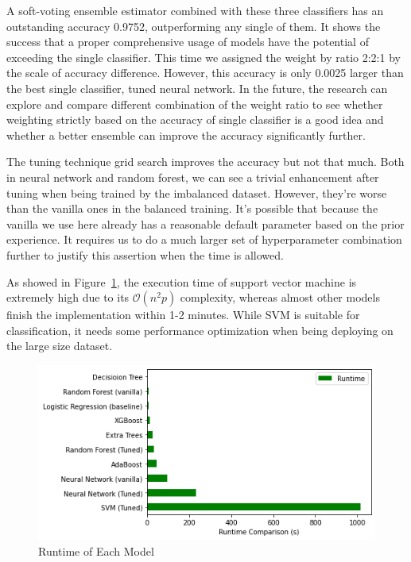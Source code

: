 \documentclass[10pt,twocolumn,letterpaper]{article}
\begin{document}
A soft-voting ensemble estimator combined with these three classifiers has an outstanding accuracy 0.9752, outperforming any single of them. It shows the success that a proper comprehensive usage of models have the potential of exceeding the single classifier. This time we assigned the weight by ratio 2:2:1 by the scale of accuracy difference. However, this accuracy is only 0.0025 larger than the best single classifier, tuned neural network. In the future, the research can explore and compare different combination of the weight ratio to see whether weighting strictly based on the accuracy of single classifier is a good idea and whether a better ensemble can improve the accuracy significantly further.

The tuning technique grid search improves the accuracy but not that much. Both in neural network and random forest, we can see a trivial enhancement after tuning when being trained by the imbalanced dataset. However, they're worse than the vanilla ones in the balanced training. It's possible that because the vanilla we use here already has a reasonable default parameter based on the prior experience. It requires us to do a much larger set of hyperparameter combination further to justify this assertion when the time is allowed.

As showed in Figure~\ref{fig:Runtime}, the execution time of support vector machine is extremely high due to its $\mathcal{O}(n^2 p)$ complexity, whereas almost other models finish the implementation within 1-2 minutes. While SVM is suitable for classification, it needs some performance optimization when being deploying on the large size dataset.

\begin{figure}[ht]
\begin{center}
    \includegraphics[width=0.8\linewidth]{images/Runtime.png}
\end{center}
   \caption{Runtime of Each Model}
\label{fig:Runtime}
\end{figure}
\end{document}
